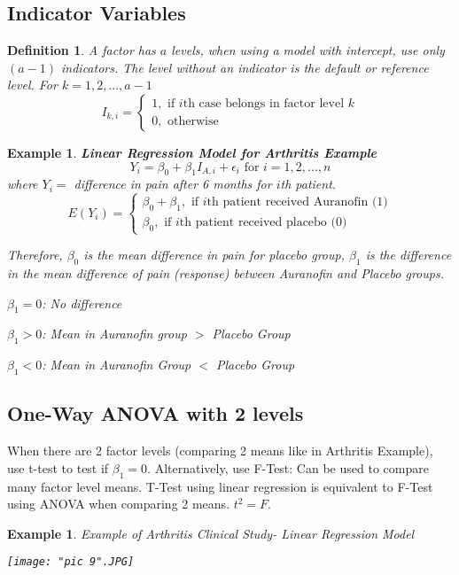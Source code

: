 \documentclass[a4paper,11pt]{article}
\newtheorem{defn}[thm]{Definition}
\newtheorem{eg}[thm]{Example}
\begin{document}
\subsection{Indicator Variables}
\begin{defn}
\normalfont
A factor has $a$ levels, when using a model with intercept, use only $(a-1)$ indicators. The level without an indicator is the default or reference level. For $k=1,2,...,a-1$
$$
I_{k,i}=
\begin{cases}
1, \text{\ if $i$th case belongs in factor level $k$}\\
0, \text{\ otherwise}
\end{cases}
$$
\end{defn}
\begin{eg}
\normalfont
\textbf{Linear Regression Model for Arthritis Example}
$$Y_i=\beta_0+\beta_1I_{A,i}+\epsilon_i\text{ for } i=1,2,...,n$$
where $Y_i=$ difference in pain after 6 months for $i$th patient. 
$$
E(Y_i)=
\begin{cases}
\beta_0+\beta_1, \text{\ if $i$th patient received Auranofin (1)}\\
\beta_0, \text{\ if $i$th patient received placebo (0)}
\end{cases}
$$

Therefore, {$\beta_0$ is the mean difference in pain for placebo group}, {$\beta_1$ is the difference in the mean} {difference of pain (response) between Auranofin and Placebo groups. }

$\beta_1=0$: No difference

$\beta_1>0$: Mean in Auranofin group $>$ Placebo Group

$\beta_1<0$: Mean in Auranofin Group $<$ Placebo Group
\end{eg}

\subsection{One-Way ANOVA with 2 levels}
When there are 2 factor levels (comparing 2 means like in Arthritis Example), use t-test to test if $\beta_1=0$. Alternatively, use F-Test: Can be used to compare {many} factor level means. T-Test using linear regression is {equivalent} to F-Test using ANOVA when comparing 2 means. $t^2=F$. 
\newpage
\begin{eg}
\normalfont
Example of Arthritis Clinical Study- Linear Regression Model

\begin{center}
	\texttt{[image: "pic 9".JPG]}
\end{center}

\end{eg}
\end{document}

